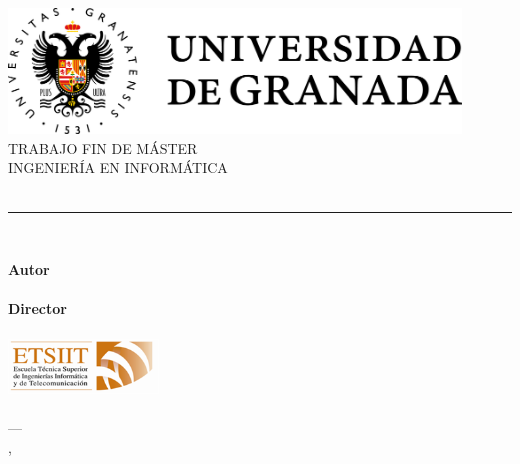 \begin{titlepage}
 
\newlength{\centeroffset}
\setlength{\centeroffset}{-0.5\oddsidemargin}
\addtolength{\centeroffset}{0.5\evensidemargin}
\thispagestyle{empty}

\noindent\hspace*{\centeroffset}
\begin{minipage}{\textwidth}
\centering
\includegraphics[width=0.9\textwidth]{imagenes/ugr}\\[1.4cm]
\textsc{ \Large TRABAJO FIN DE MÁSTER\\[0.2cm]}
\textsc{ INGENIERÍA EN INFORMÁTICA}\\[1cm]
{\Huge\bfseries \myTitle \\}
\noindent\rule[-1ex]{\textwidth}{3pt}\\[3.5ex]
{\large\bfseries \mySubtitle}
\end{minipage}

\vspace{2.5cm}

\noindent\hspace*{\centeroffset}
\begin{minipage}{\textwidth}
\centering
\textbf{Autor}\\ {\myName}\\[2.5ex]
\textbf{Director}\\ {\myProf}\\[2cm]
\includegraphics[width=0.3\textwidth]{imagenes/etsiit}\\[0.1cm]
\textsc{\myFaculty}\\
\textsc{---}\\
\myLocation, \myTime
\end{minipage}

\end{titlepage}


